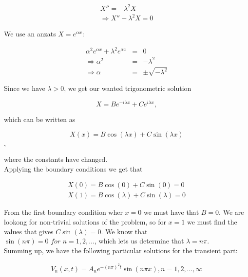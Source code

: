 \documentclass{article}
\begin{document}
\begin{subequations}
	\begin{eqnarray}
	X'' = -\lambda^2 X \\
	\Rightarrow X'' + \lambda^2 X = 0 
	\end{eqnarray}
\end{subequations}

We use an anzats $X=e^{\alpha x}$:

\begin{subequations}
	\begin{eqnarray}
	\alpha^2 e^{\alpha x} + \lambda^2 e^{\alpha x} &=& 0 \\ 
	\Rightarrow \alpha^2 &=& -\lambda^2 \\ 
	\Rightarrow \alpha &=& \pm \sqrt{-\lambda^2}
	\end{eqnarray}
\end{subequations}

Since we have $\lambda > 0$, we get our wanted trigonometric solution

\begin{equation}
X = Be^{-i\lambda x} + Ce^{i\lambda x},
\label{eqn:xDependenttransientTerm1D}
\end{equation}

which can be written as

\begin{equation}
X(x) = B\cos(\lambda x) + C\sin(\lambda x) 
\end{equation},

where the constants have changed.\\

Applying the boundary conditions we get that

\begin{eqnarray}
X(0) = B\cos(0) + C\sin(0) = 0 \\ 
X(1) = B\cos(\lambda) + C\sin(\lambda) = 0
\end{eqnarray}

From the first boundary condition wher $x=0$ we must have that $B=0$. We are lookong for non-trivial solutions of the problem, so for $x=1$ we must find the  values that gives $C\sin(\lambda)=0$. We know that\\ $\sin(n \pi) =0 \textit{ for } n = 1,2, \ldots $, which lets us determine that $\lambda = n \pi$.\\

Summing up, we have the following particular solutions for the transient part:

\begin{subequations}
	\begin{eqnarray}
	V_n(x,t) = A_ne^{-(n\pi)^2 t}\sin(n \pi x), n=1,2,...,\infty
	\end{eqnarray}
\end{subequations}
\end{document}

